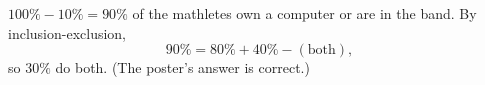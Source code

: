 $100\%-10\%=90\%$ of the mathletes own a computer or are in the band. By inclusion-exclusion,
\[
90\%=80\%+40\%-(\text{both}),
\]
so $\boxed{30\%}$ do both. (The poster's answer is correct.)
